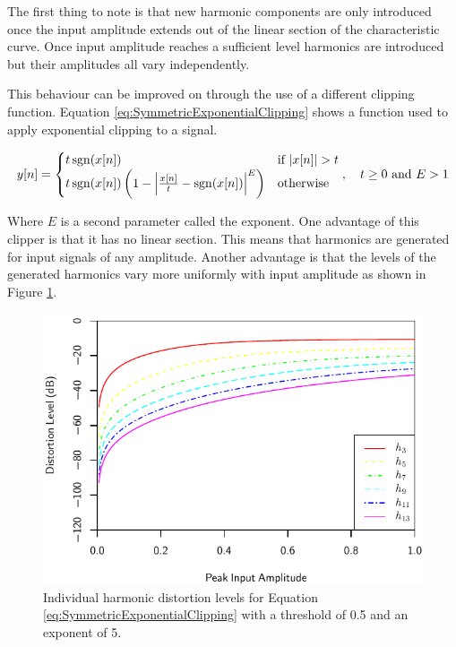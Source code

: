 			The first thing to note is that new harmonic components are only introduced once the input
			amplitude extends out of the linear section of the characteristic curve. Once input amplitude
			reaches a sufficient level harmonics are introduced but their amplitudes all vary independently.

			This behaviour can be improved on through the use of a different clipping function. Equation
			\ref{eq:SymmetricExponentialClipping} shows a function used to apply exponential clipping to a
			signal.
			
			\begin{equation}
				y[n] = \begin{cases}
					t\operatorname{sgn}(x[n]) & \text{if $\left|x[n]\right| > t$} \\
					t\operatorname{sgn}(x[n]) \left(1 - \left|\frac{x[n]}{t} - \operatorname{sgn}(x[n])\right|^{E} \right) &
						\text{otherwise}
				\end{cases}, \quad t \geq 0 \ \text{and} \ E > 1
				\label{eq:SymmetricExponentialClipping}
			\end{equation}

			Where $E$ is a second parameter called the exponent. One advantage of this clipper is that it has
			no linear section. This means that harmonics are generated for input signals of any amplitude.
			Another advantage is that the levels of the generated harmonics vary more uniformly with input
			amplitude as shown in Figure \ref{fig:ExponentialClippingHarmonics}.

			\begin{figure}[h!]
				\centering
				\includegraphics{chapter5/Images/ExponentialClippingHarmonics.pdf}
				\caption{Individual harmonic distortion levels for Equation
					 \ref{eq:SymmetricExponentialClipping} with a threshold of 0.5 and an 
				         exponent of 5.}
				\label{fig:ExponentialClippingHarmonics}
			\end{figure}


